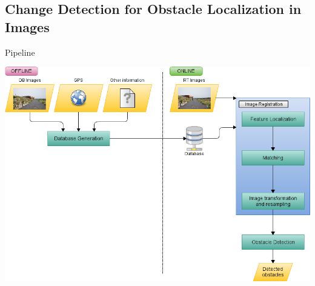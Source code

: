 \graphicspath{
  {./images/bmps/}{./images/vects/}{./images/}
  {./images/presentation/bmps/}{./images/presentation/vects/}{./images/presentation/}
  {./images/chapter00/bmps/}{./images/chapter00/vects/}{./images/chapter00/}
  {./images/chapter01/bmps/}{./images/chapter01/vects/}{./images/chapter01/}
}

\subsection{Change Detection for Obstacle Localization in Images}
\begin{frame}{Pipeline}
  \begin{center}
    \includegraphics{pipeline_cp01}
  \end{center}
  
  \note {
  }
\end{frame}

